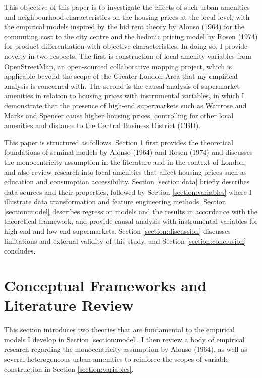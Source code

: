 \documentclass{article}
\begin{document}
This objective of this paper is to investigate the effects of such urban amenities and neighbourhood characteristics on the housing prices at the local level, with the empirical models inspired by the bid rent theory by Alonso (1964) for the commuting cost to the city centre and the hedonic pricing model by Rosen (1974) for product differentiation with objective characteristics. In doing so, I provide novelty in two respects. The first is construction of local amenity variables from OpenStreetMap, an open-sourced collaborative mapping project, which is applicable beyond the scope of the Greater London Area that my empirical analysis is concerned with. The second is the causal analysis of supermarket amenities in relation to housing prices with instrumental variables, in which I demonstrate that the presence of high-end supermarkets such as Waitrose and Marks and Spencer cause higher housing prices, controlling for other local amenities and distance to the Central Business District (CBD).

This paper is structured as follows. Section \ref{section:lit} first provides the theoretical foundations of seminal models by Alonso (1964) and Rosen (1974) and discusses the monocentricity assumption in the literature and in the context of London, and also review research into local amenities that affect housing prices such as education and consumption accessibility. Section \ref{section:data} briefly describes data sources and their properties, followed by Section \ref{section:variables} where I illustrate data transformation and feature engineering methods. Section \ref{section:model} describes regression models and the results in accordance with the theoretical framework, and provide causal analysis with instrumental variables for high-end and low-end supermarkets. Section \ref{section:discussion} discusses limitations and external validity of this study, and Section \ref{section:conclusion} concludes.


\section{Conceptual Frameworks and Literature Review} \label{section:lit}
This section introduces two theories that are fundamental to the empirical models I develop in Section \ref{section:model}. I then review a body of empirical research regarding the monocentricity assumption by Alonso (1964), as well as several heterogeneous urban amenities to reinforce the scopes of variable construction in Section \ref{section:variables}.
\end{document}
